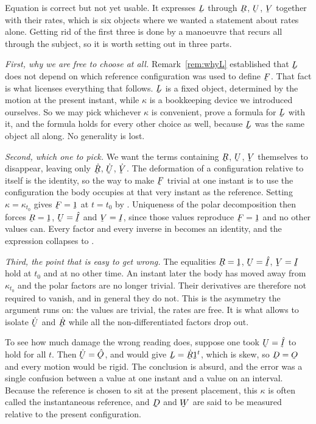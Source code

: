\begin{remark}\label{rem:whykt0}
Equation  is correct but not yet usable. It expresses $\bL$
through $\bR$, $\bU$, $\bV$ together with their rates, which is six
objects where we wanted a statement about rates alone. Getting rid of the
first three is done by a manoeuvre that recurs all through the subject, so
it is worth setting out in three parts.

\emph{First, why we are free to choose at all.} Remark~\ref{rem:whyL}
established that $\bL$ does not depend on which reference configuration
was used to define $\bF$. That fact is what licenses everything that
follows. $\bL$ is a fixed object, determined by the motion at the present
instant, while $\kappa$ is a bookkeeping device we introduced ourselves.
So we may pick whichever $\kappa$ is convenient, prove a formula for
$\bL$ with it, and the formula holds for every other choice as well,
because $\bL$ was the same object all along. No generality is lost.

\emph{Second, which one to pick.} We want the terms containing $\bR$,
$\bU$, $\bV$ themselves to disappear, leaving only $\dot\bR$, $\dot\bU$,
$\dot\bV$. The deformation of a configuration relative to itself is the
identity, so the way to make $\bF$ trivial at one instant is to use the
configuration the body occupies at that very instant as the reference.
Setting $\kappa=\kappa_{t_{0}}$ gives $\bF=\shift$ at $t=t_{0}$ by
. Uniqueness of the polar decomposition then forces
$\bR=\shift$, $\bU=\hI$ and $\bV=\I$, since those values reproduce
$\bF=\shift$ and no other values can. Every factor and every inverse in
 becomes an identity, and the expression collapses to .

\emph{Third, the point that is easy to get wrong.} The equalities
$\bR=\shift$, $\bU=\hI$, $\bV=\I$ hold at $t_{0}$ and at no other time.
An instant later the body has moved away from $\kappa_{t_{0}}$ and the
polar factors are no longer trivial. Their derivatives are therefore not
required to vanish, and in general they do not. This is the asymmetry the
argument runs on: the values are trivial, the rates are free. It is what
allows  to isolate $\dot\bU$ and $\dot\bR$ while all the
non-differentiated factors drop out.

To see how much damage the wrong reading does, suppose one took $\bU=\hI$
to hold for all $t$. Then $\dot\bU=\hOb$, and  would give
$\bL=\dot\bR\shift^{t}$, which is skew, so $\bD=\Ob$ and every motion
would be rigid. The conclusion is absurd, and the error was a single
confusion between a value at one instant and a value on an interval.
Because the reference is chosen to sit at the present placement, this
$\kappa$ is often called the instantaneous reference, and $\bD$ and $\bW$
are said to be measured relative to the present configuration.
\end{remark}

